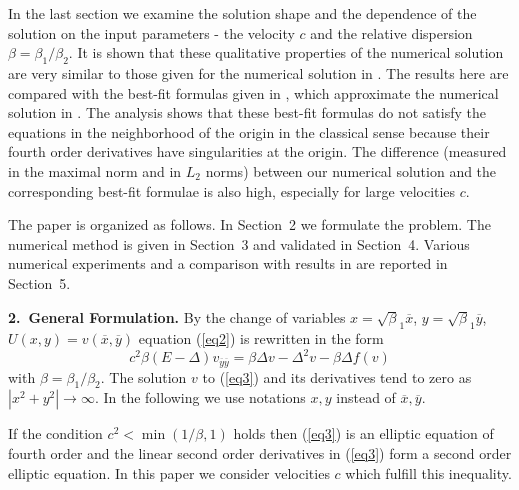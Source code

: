 \documentclass[leqno,11pt]{book}
\newcommand{\rf}[1]{(\ref{#1})}
\newcommand{\sect}[1]{\bigskip \par {\large\bf #1}}
\begin{document}
In the last section we examine the solution shape and the dependence of the solution on the input  parameters - the velocity $c$ and the relative dispersion $\beta =\beta_1  / \beta_2$. It is shown that these qualitative properties of the numerical solution are very similar to those given for the  numerical solution in \cite{Ch2011,Ch2012}. 
The results here are compared with the best-fit formulas given in \cite{Ch2011}, which approximate the numerical solution in \cite{Ch2011,Ch2012}. 
The analysis  shows that  these best-fit formulas do not satisfy the equations in the neighborhood of the origin in the classical sense because their fourth order derivatives have singularities at the origin.  The  difference (measured in the maximal norm and in $L_2$ norms)  between our numerical solution and the corresponding best-fit formulae is also high, especially  for large velocities $c$. 

The paper is organized as follows. In Section~2 we formulate the  problem. The numerical method is given in Section~3 and validated in Section~4.  Various numerical  experiments and a comparison with  results in \cite{Ch2011,Ch2012} are reported in Section~5.

\bigskip

\sect{2.~General Formulation.}
By the change of variables $x=\sqrt\beta_1 { \overline x}$, $y=\sqrt\beta_1 { \overline y}$, $U(x,y)= v({ \overline x},{ \overline y} )$ 
 equation \rf{eq2} is rewritten in the form 
 \begin{equation}\label{eq3}
c^2 \beta (E- \Delta) v_{{\overline y}{\overline y}} = \beta \Delta v - \Delta^2 v - \beta \Delta f(v)
\end{equation}
with   $\beta = \beta_1 / \beta_2$.
The solution $v$ to \rf{eq3} and its derivatives  tend to zero as $|x^2 +y^2|\rightarrow \infty$.
In the following we use notations $x,y$ instead of ${\overline x},{\overline y}$.

If the condition $c^2 < \min (1/ \beta,1)$ holds then  \rf{eq3} is an elliptic equation of fourth order and the linear second order derivatives in \rf{eq3} form  a second order elliptic equation. In this paper we consider velocities $c$ which fulfill this inequality.
\end{document}
